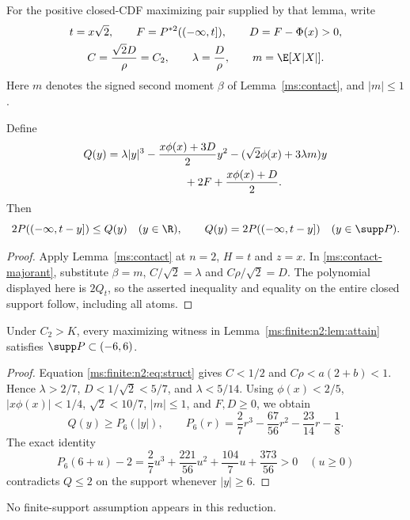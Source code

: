 For the positive closed-CDF maximizing pair supplied by that lemma, write
\[
 \begin{gathered}
 t=x\sqrt2,\qquad F=P^{*2}(( -\infty,t]),\qquad D=F-\Phi(x)>0,\\
 C=\frac{\sqrt2D}{\rho}=C_2,\qquad
 \lambda=\frac D\rho,\qquad m=\E[X|X|].
 \end{gathered}
\]
Here $m$ denotes the signed second moment $\beta$ of
Lemma~\ref{ms:contact}, and $|m|\le1$.

\begin{lemma}\label{ms:finite:n2:lem:contact}
Define
\begin{align}
 Q(y)={}&\lambda|y|^3-\frac{x\phi(x)+3D}{2}y^2
       -(\sqrt2\phi(x)+3\lambda m)y\notag\\
       &\hspace{20mm}+2F+\frac{x\phi(x)+D}{2}.\label{ms:finite:n2:eq:Q}
\end{align}
Then
\begin{equation}\label{ms:finite:n2:eq:contact}
 2P(( -\infty,t-y])\le Q(y)\quad(y\in\R),
 \qquad Q(y)=2P(( -\infty,t-y])\quad(y\in\supp P).
\end{equation}
\end{lemma}
\begin{proof}
Apply Lemma~\ref{ms:contact} at $n=2$, $H=t$ and $z=x$.
In \eqref{ms:contact-majorant}, substitute $\beta=m$,
$C/\sqrt2=\lambda$ and $C\rho/\sqrt2=D$. The polynomial displayed
here is $2Q_t$, so the asserted inequality and equality on the entire
closed support follow, including all atoms.
\end{proof}

\begin{lemma}\label{ms:finite:n2:lem:support}
Under $C_2>K$, every maximizing witness in Lemma~\ref{ms:finite:n2:lem:attain} satisfies
$\supp P\subset(-6,6)$.
\end{lemma}
\begin{proof}
Equation \eqref{ms:finite:n2:eq:struct} gives $C<1/2$ and $C\rho<a(2+b)<1$.
Hence $\lambda>2/7$, $D<1/\sqrt2<5/7$, and $\lambda<5/14$.
Using $\phi(x)<2/5$, $|x\phi(x)|<1/4$, $\sqrt2<10/7$,
$|m|\le1$, and $F,D\ge0$, we obtain
\[
 Q(y)\ge P_6(|y|),\qquad
 P_6(r)=\frac27r^3-\frac{67}{56}r^2-\frac{23}{14}r-\frac18.
\]
The exact identity
\[
 P_6(6+u)-2
 =\frac27u^3+\frac{221}{56}u^2+\frac{104}{7}u+\frac{373}{56}>0
 \quad(u\ge0)
\]
contradicts $Q\le2$ on the support whenever $|y|\ge6$.
\end{proof}
No finite-support assumption appears in this reduction.

